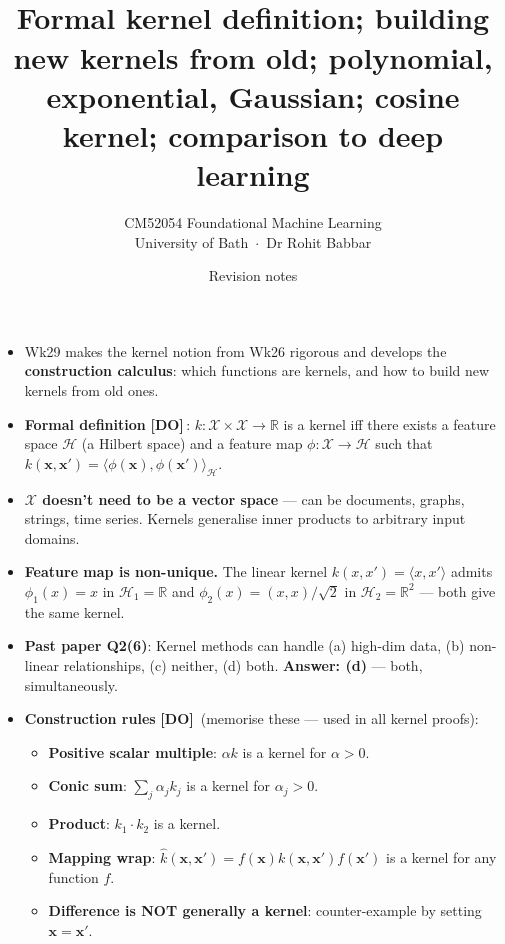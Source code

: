 \documentclass[11pt, a4paper]{article}
\title{\vspace{-1cm}{\Huge\bfseries Week 29 — Kernel Methods in Machine Learning} \\[0.4em]{\large Formal kernel definition; building new kernels from old; polynomial, exponential, Gaussian; cosine kernel; comparison to deep learning}}
\author{\large CM52054 Foundational Machine Learning \\[0.2em]\normalsize University of Bath \,$\cdot$\, Dr Rohit Babbar}
\date{Revision notes}
\newcommand{\doflag}{\textcolor{defBd}{\textbf{[DO]}}\,}
\begin{document}
\maketitle\thispagestyle{empty}\vspace{1em}

\begin{tldrbox}
\begin{itemize}[leftmargin=*]
  \item Wk29 makes the kernel notion from Wk26 rigorous and develops the \textbf{construction calculus}: which functions are kernels, and how to build new kernels from old ones.
  \item \textbf{Formal definition} \doflag{}: $k : \mathcal{X}\times\mathcal{X} \to \mathbb{R}$ is a kernel iff there exists a feature space $\mathcal{H}$ (a Hilbert space) and a feature map $\phi : \mathcal{X} \to \mathcal{H}$ such that $k(\mathbf{x}, \mathbf{x}') = \langle\phi(\mathbf{x}), \phi(\mathbf{x}')\rangle_{\mathcal{H}}$.
  \item \textbf{$\mathcal{X}$ doesn't need to be a vector space} — can be documents, graphs, strings, time series. Kernels generalise inner products to arbitrary input domains.
  \item \textbf{Feature map is non-unique.} The linear kernel $k(x, x') = \langle x, x'\rangle$ admits $\phi_1(x) = x$ in $\mathcal{H}_1 = \mathbb{R}$ and $\phi_2(x) = (x, x)/\sqrt 2$ in $\mathcal{H}_2 = \mathbb{R}^2$ — both give the same kernel.
  \item \textbf{Past paper Q2(6)}: Kernel methods can handle (a) high-dim data, (b) non-linear relationships, (c) neither, (d) both. \textbf{Answer: (d)} — both, simultaneously.
  \item \textbf{Construction rules} \doflag{} (memorise these — used in all kernel proofs):
  \begin{itemize}
    \item \textbf{Positive scalar multiple}: $\alpha k$ is a kernel for $\alpha > 0$.
    \item \textbf{Conic sum}: $\sum_j \alpha_j k_j$ is a kernel for $\alpha_j > 0$.
    \item \textbf{Product}: $k_1 \cdot k_2$ is a kernel.
    \item \textbf{Mapping wrap}: $\hat k(\mathbf{x}, \mathbf{x}') = f(\mathbf{x}) k(\mathbf{x}, \mathbf{x}') f(\mathbf{x}')$ is a kernel for any function $f$.
    \item \textbf{Difference is NOT generally a kernel}: counter-example by setting $\mathbf{x} = \mathbf{x}'$.

\end{itemize}
\end{itemize}
\end{tldrbox}
\end{document}
